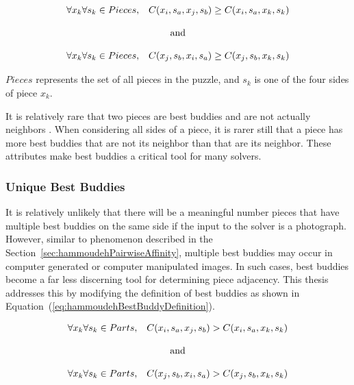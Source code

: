 \documentclass{report}
\def\eref#1{(\ref{#1})}
\begin{document}
\begin{equation} \label{eq:pomeranzBestBuddyDefinition}
\begin{split}
\begin{matrix}
\forall{x_k} \forall{s_k} \in {Pieces}, & C(x_i, s_a, x_j, s_b) \geq C(x_i, s_a, x_k, s_k)
\\
\\
\multicolumn{2}{c}{\textnormal{and}}
\\
\\
\forall{x_k} \forall{s_k} \in {Pieces}, & C(x_j, s_b, x_i, s_a) \geq C(x_j, s_b, x_k, s_k)
\end{matrix}
\end{split}
\end{equation}

\noindent
${Pieces}$ represents the set of all pieces in the puzzle, and $s_k$ is one of the four sides of piece $x_k$.

It is relatively rare that two pieces are best buddies and are not actually neighbors \cite{paikin2015}.  When considering all sides of a piece, it is rarer still that a piece has more best buddies that are not its neighbor than that are its neighbor.  These attributes make best buddies a critical tool for many solvers.

\subsubsection{Unique Best Buddies}\label{sec:improvedBestBuddies}

It is relatively unlikely that there will be a meaningful number pieces that have multiple best buddies on the same side if the input to the solver is a photograph.  However, similar to phenomenon described in the Section~\ref{sec:hammoudehPairwiseAffinity}, multiple best buddies may occur in computer generated or computer manipulated images.  In such cases, best buddies become a far less discerning tool for determining piece adjacency.  This thesis addresses this by modifying the definition of best buddies as shown in Equation~\eref{eq:hammoudehBestBuddyDefinition}.

\begin{equation} \label{eq:hammoudehBestBuddyDefinition}
\begin{split}
\begin{matrix}
\forall{x_k} \forall{s_k} \in Parts, & C(x_i, s_a, x_j, s_b) > C(x_i, s_a, x_k, s_k)
\\
\\
\multicolumn{2}{c}{\textnormal{and}}
\\
\\
\forall{x_k} \forall{s_k} \in Parts, & C(x_j, s_b, x_i, s_a) > C(x_j, s_b, x_k, s_k)
\end{matrix}
\end{split}
\end{equation}
\end{document}
